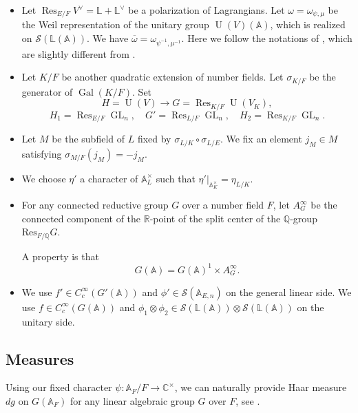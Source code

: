 \documentclass[11pt, reqno]{amsart}
\numberwithin{equation}{subsection}
\theoremstyle{plain}
\theoremstyle{definition}
\newcommand{\BA}{\mathbb A}
\newcommand{\BC}{\mathbb C}
\newcommand{\BR}{\mathbb R}
\newcommand{\BQ}{\mathbb Q}
\renewcommand{\AA}{\mathbb A}
\newcommand{\LL}{\mathbb L}
\newcommand{\cS}{\mathcal S}
\DeclareMathOperator{\Gal}{Gal}
\DeclareMathOperator{\GL}{GL}
\DeclareMathOperator{\Res}{Res}
\DeclareMathOperator{\U}{U}
\begin{document}
\begin{itemize}
\item Let $\Res_{E/F} V^\vee =\LL + \LL^\vee$ be a polarization of Lagrangians. Let $\omega=\omega_{\psi, \mu}$ be the Weil representation
of the unitary group $\U(V)(\AA)$, which is realized on
$\cS(\LL(\AA))$. We have $\overline{\omega}=\omega_{\psi^{-1}, \mu^{-1}}$. Here we follow the notations of \cite{Xue-GGP}, which are slightly different from \cite{GGP-FourierJacobi}.

\item Let $K/F$ be another quadratic extension of number fields. Let $\sigma_{K/F}$ be the generator of $\Gal(K/F)$. 
Set 
$$
H=\U(V) \to G=\Res_{K/F}\U(V_K),
$$
\[
H_1 = \Res_{E/F} \GL_n, \quad G' = \Res_{L/F} \GL_n, \quad H_2 = \Res_{K/F} \GL_n.
\]

\item Let $M$ be the subfield of $L$ fixed by $\sigma_{L/K} \circ \sigma_{L/E}$.
We fix an element $j_M \in M$ satisfying 
$\sigma_{M/F}(j_M) = - j_M$.

\item We choose $\eta'$ a character of $\BA^\times_L$ such that $\eta'|_{\BA^\times_K}=\eta_{L/K}$. 

\item For any connected reductive group $G$ over a number field $F$, let $A_G^\infty$ be the connected component of the $\BR$-point of the split center of the $\BQ$-group $\mathrm{Res}_{F/\BQ} G$.

A property is that
\[
    G(\BA) = G(\BA)^1 \times A_{G}^\infty.
\]

\item We use 
$f' \in C_c^\infty(G'(\AA))$ and $\phi' \in
\cS(\AA_{E,n})$ on the general linear side. We use $f \in C_c^\infty(G(\AA))$ and
$\phi_1 \otimes \phi_2 \in \cS(\LL(\mathbb A)) \otimes \cS(\LL(\mathbb A))$ on the unitary side.

\end{itemize}


\subsection{Measures}
Using our fixed character $\psi: \BA_F/F \to \BC^{\times}$, we can naturally provide Haar measure $dg$ on $G(\BA_F)$ for any linear algebraic group $G$ over $F$, see \cite[Section 2.3]{GGP-endoscopic}.
\end{document}
